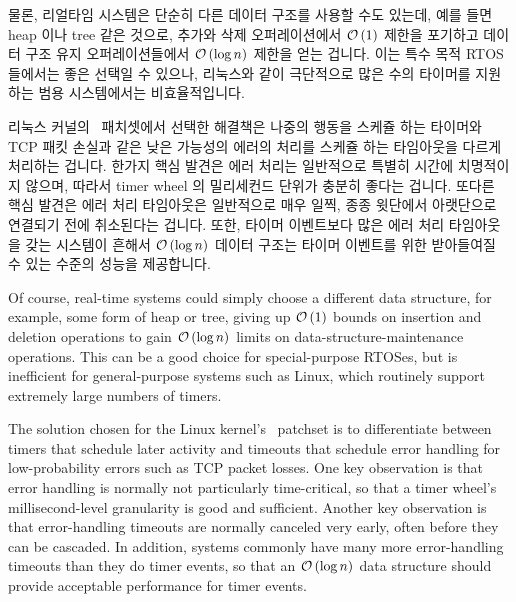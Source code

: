 
물론, 리얼타임 시스템은 단순히 다른 데이터 구조를 사용할 수도 있는데, 예를 들면
heap 이나 tree 같은 것으로, 추가와 삭제 오퍼레이션에서 $\mathcal{O}\left(1\right)$ 제한을 포기하고
데이터 구조 유지 오퍼레이션들에서 $\mathcal{O}\left(\log n\right)$ 제한을 얻는 겁니다.
이는 특수 목적 RTOS 들에서는 좋은 선택일 수 있으나, 리눅스와 같이 극단적으로
많은 수의 타이머를 지원하는 범용 시스템에서는 비효율적입니다.

리눅스 커널의 \rt\ 패치셋에서 선택한 해결책은 나중의 행동을 스케쥴 하는
타이머와 TCP 패킷 손실과 같은 낮은 가능성의 에러의 처리를 스케쥴 하는
타임아웃을 다르게 처리하는 겁니다.
한가지 핵심 발견은 에러 처리는 일반적으로 특별히 시간에 치명적이지 않으며,
따라서 timer wheel 의 밀리세컨드 단위가 충분히 좋다는 겁니다.
또다른 핵심 발견은 에러 처리 타임아웃은 일반적으로 매우 일찍, 종종 윗단에서
아랫단으로 연결되기 전에 취소된다는 겁니다.
또한, 타이머 이벤트보다 많은 에러 처리 타임아웃을 갖는 시스템이 흔해서 $\mathcal{O}\left(\log
n\right)$ 데이터 구조는 타이머 이벤트를 위한 받아들여질 수 있는 수준의 성능을
제공합니다.

\iffalse

Of course, real-time systems could simply choose a different data
structure, for example, some form of heap or tree, giving up
$\mathcal{O}\left(1\right)$ bounds on insertion and deletion operations to gain $\mathcal{O}\left(\log n\right)$
limits on data-structure-maintenance operations.
This can be a good choice for special-purpose RTOSes, but is inefficient
for general-purpose systems such as Linux, which routinely support
extremely large numbers of timers.

The solution chosen for the Linux kernel's \rt\ patchset is to differentiate
between timers that schedule later activity and timeouts that schedule
error handling for low-probability errors such as TCP packet losses.
One key observation is that error handling is normally not particularly
time-critical, so that a timer wheel's millisecond-level granularity
is good and sufficient.
Another key observation is that error-handling timeouts are normally
canceled very early, often before they can be cascaded.
In addition, systems commonly have many more error-handling timeouts
than they do timer events, so that an $\mathcal{O}\left(\log n\right)$ data structure should
provide acceptable performance for timer events.

